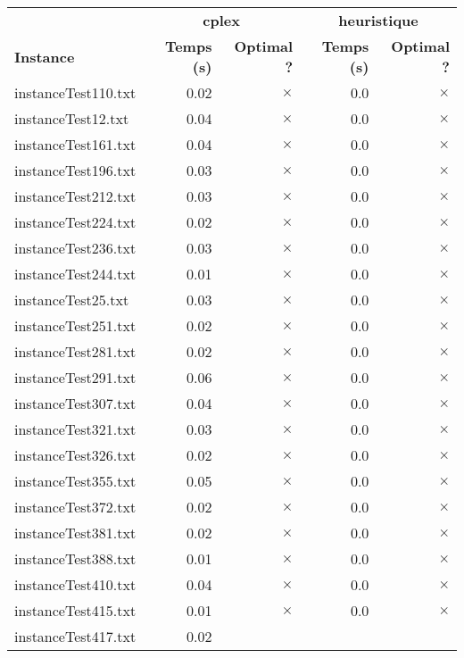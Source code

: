 \documentclass{article}
\begin{document}
\begin{center}
\renewcommand{\arraystretch}{1.4} 
 \begin{tabular}{lrrrr}
	\hline
 & \multicolumn{2}{c}{\textbf{cplex}} & \multicolumn{2}{c}{\textbf{heuristique}}\\
\textbf{Instance}  & \textbf{Temps (s)} & \textbf{Optimal ?}  & \textbf{Temps (s)} & \textbf{Optimal ?} \\\hline

instanceTest110.txt & 0.02 & 
$\times$
 & 0.0 & 
$\times$
\\
instanceTest12.txt & 0.04 & 
$\times$
 & 0.0 & 
$\times$
\\
instanceTest161.txt & 0.04 & 
$\times$
 & 0.0 & 
$\times$
\\
instanceTest196.txt & 0.03 & 
$\times$
 & 0.0 & 
$\times$
\\
instanceTest212.txt & 0.03 & 
$\times$
 & 0.0 & 
$\times$
\\
instanceTest224.txt & 0.02 & 
$\times$
 & 0.0 & 
$\times$
\\
instanceTest236.txt & 0.03 & 
$\times$
 & 0.0 & 
$\times$
\\
instanceTest244.txt & 0.01 & 
$\times$
 & 0.0 & 
$\times$
\\
instanceTest25.txt & 0.03 & 
$\times$
 & 0.0 & 
$\times$
\\
instanceTest251.txt & 0.02 & 
$\times$
 & 0.0 & 
$\times$
\\
instanceTest281.txt & 0.02 & 
$\times$
 & 0.0 & 
$\times$
\\
instanceTest291.txt & 0.06 & 
$\times$
 & 0.0 & 
$\times$
\\
instanceTest307.txt & 0.04 & 
$\times$
 & 0.0 & 
$\times$
\\
instanceTest321.txt & 0.03 & 
$\times$
 & 0.0 & 
$\times$
\\
instanceTest326.txt & 0.02 & 
$\times$
 & 0.0 & 
$\times$
\\
instanceTest355.txt & 0.05 & 
$\times$
 & 0.0 & 
$\times$
\\
instanceTest372.txt & 0.02 & 
$\times$
 & 0.0 & 
$\times$
\\
instanceTest381.txt & 0.02 & 
$\times$
 & 0.0 & 
$\times$
\\
instanceTest388.txt & 0.01 & 
$\times$
 & 0.0 & 
$\times$
\\
instanceTest410.txt & 0.04 & 
$\times$
 & 0.0 & 
$\times$
\\
instanceTest415.txt & 0.01 & 
$\times$
 & 0.0 & 
$\times$
\\
instanceTest417.txt & 0.02 & 

\end{tabular}
\end{center}
\end{document}
